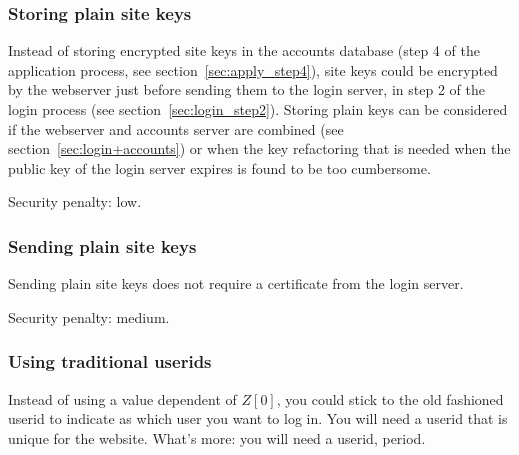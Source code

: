 \subsubsection{Storing plain site keys}
Instead of storing encrypted site keys in the accounts database
(step 4 of the application process,
see section~\vref{sec:apply_step4}),
site keys could be encrypted by the webserver just before sending them to the login server,
in step 2 of the login process (see section~\vref{sec:login_step2}).
Storing plain keys can be considered if the webserver and accounts server are combined
(see section~\vref{sec:login+accounts})
or when the key refactoring that is needed when the public key of the login server expires is found to be too cumbersome.
\par
Security penalty: low.
\subsubsection{Sending plain site keys}
Sending plain site keys does not require a certificate from the login server.
\par
Security penalty: medium.
\subsubsection{Using traditional userids}
Instead of using a value dependent of $Z[0]$,
you could stick to the old fashioned userid to indicate as which user you want to log in.
You will need a userid that is unique for the website.
What's more:
you will need a userid,
period.
